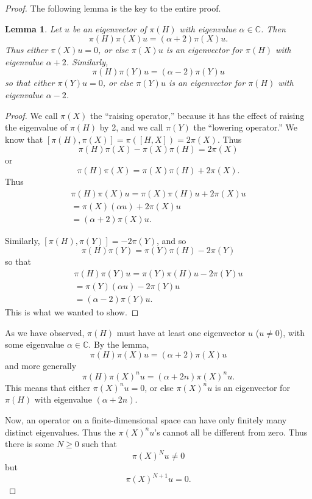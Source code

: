 \documentclass{amsbook}
\theoremstyle{plain}
\newtheorem{lemma}[theorem]{Lemma}
\numberwithin{equation}{chapter}
\numberwithin{theorem}{chapter}
\begin{document}
\begin{proof}
The following lemma is the key to the entire proof.

\begin{lemma}
\label{raising.op}Let $u$ be an eigenvector of $\pi(H)$ with eigenvalue
$\alpha\in\mathbb{C}$. Then
\[
\pi(H)\pi(X)u=(\alpha+2)\pi(X)u\text{.}%
\]
Thus either $\pi(X)u=0$, or else $\pi(X)u$ is an eigenvector for $\pi(H)$ with
eigenvalue $\alpha+2$. Similarly,
\[
\pi(H)\pi(Y)u=(\alpha-2)\pi(Y)u
\]
so that either $\pi(Y)u=0$, or else $\pi(Y)u$ is an eigenvector for $\pi(H)$
with eigenvalue $\alpha-2$.
\end{lemma}

\begin{proof}
We call $\pi(X)$ the ``raising operator,'' because it has the effect of
raising the eigenvalue of $\pi(H)$ by 2, and we call $\pi(Y)$ the ``lowering
operator.'' We know that $\left[  \pi(H),\pi(X)\right]  =\pi\left(  \left[
H,X\right]  \right)  =2\pi(X)$. Thus
\[
\pi(H)\pi(X)-\pi(X)\pi(H)=2\pi(X)
\]
or
\[
\pi(H)\pi(X)=\pi(X)\pi(H)+2\pi(X)\text{.}%
\]
Thus
\begin{align*}
\pi(H)\pi(X)u=\pi(X)\pi(H)u+2\pi(X)u\\
=\pi(X)\left(  \alpha u\right)  +2\pi(X)u\\
=(\alpha+2)\pi(X)u\text{.}%
\end{align*}

Similarly, $\left[  \pi(H),\pi(Y)\right]  =-2\pi(Y)$, and so
\[
\pi(H)\pi(Y)=\pi(Y)\pi(H)-2\pi(Y)
\]
so that
\begin{align*}
\pi(H)\pi(Y)u=\pi(Y)\pi(H)u-2\pi(Y)u\\
=\pi(Y)\left(  \alpha u\right)  -2\pi(Y)u\\
=(\alpha-2)\pi(Y)u\text{.}%
\end{align*}
This is what we wanted to show.
\end{proof}

As we have observed, $\pi(H)$ must have at least one eigenvector $u$ ($u\neq
0$), with some eigenvalue $\alpha\in\mathbb{C}$. By the lemma,
\[
\pi(H)\pi(X)u=(\alpha+2)\pi(X)u
\]
and more generally
\[
\pi(H)\pi(X)^{n}u=(\alpha+2n)\pi(X)^{n}u\text{.}%
\]
This means that either $\pi(X)^{n}u=0$, or else $\pi(X)^{n}u$ is an
eigenvector for $\pi(H)$ with eigenvalue $(\alpha+2n)$.

Now, an operator on a finite-dimensional space can have only finitely many
distinct eigenvalues. Thus the $\pi(X)^{n}u$'s cannot all be different from
zero. Thus there is some $N\geq0$ such that
\[
\pi(X)^{N}u\neq0
\]
but
\[
\pi(X)^{N+1}u=0\text{.}%
\]


\end{proof}
\end{document}
